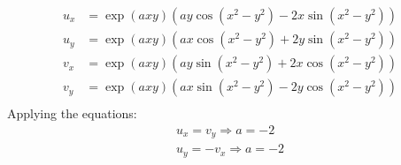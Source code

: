 \documentclass{report}
\renewcommand{\exp}[1]{\operatorname{exp}\left(#1\right)}
\renewcommand{\sin}[1]{\operatorname{sin}\left(#1\right)}
\renewcommand{\cos}[1]{\operatorname{cos}\left(#1\right)}
\begin{document}
    \begin{align*}
        u_x&=\exp{axy}(ay\cos{x^2-y^2}-2x\sin{x^2-y^2})\\
        u_y&=\exp{axy}(ax\cos{x^2-y^2}+2y\sin{x^2-y^2}) \\
        v_x&=\exp{axy}(ay\sin{x^2-y^2}+2x\cos{x^2-y^2})\\
        v_y&=\exp{axy}(ax\sin{x^2-y^2}-2y\cos{x^2-y^2}) \\
    \end{align*}
    Applying the equations:\\
    \begin{align*}
        u_x=v_y \Rightarrow a=-2\\
        u_y=-v_x \Rightarrow a=-2\\
    \end{align*}
    
\end{document}
